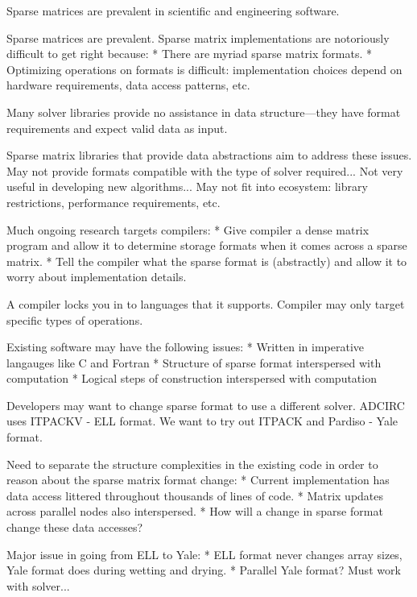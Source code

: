 \documentclass[12pt]{article}
\begin{document}
Sparse matrices are prevalent in scientific and engineering software. 

Sparse matrices are prevalent.
Sparse matrix implementations are notoriously difficult to get right because:
* There are myriad sparse matrix formats.
* Optimizing operations on formats is difficult: implementation choices depend on hardware requirements, data access patterns, etc.

Many solver libraries provide no assistance in data structure---they have format requirements and expect valid data as input.


Sparse matrix libraries that provide data abstractions aim to address these issues.
May not provide formats compatible with the type of solver required...
Not very useful in developing new algorithms...
May not fit into ecosystem: library restrictions, performance requirements, etc.

Much ongoing research targets compilers:
* Give compiler a dense matrix program and allow it to determine storage formats when it comes across a sparse matrix.
* Tell the compiler what the sparse format is (abstractly) and allow it to worry about implementation details.

A compiler locks you in to languages that it supports.
Compiler may only target specific types of operations.

Existing software may have the following issues:
* Written in imperative langauges like C and Fortran
* Structure of sparse format interspersed with computation
* Logical steps of construction interspersed with computation

Developers may want to change sparse format to use a different solver.
ADCIRC uses ITPACKV - ELL format.
We want to try out ITPACK and Pardiso - Yale format.

Need to separate the structure complexities in the existing code in order to reason about the sparse matrix format change:
* Current implementation has data access littered throughout thousands of lines of code.
* Matrix updates across parallel nodes also interspersed.
* How will a change in sparse format change these data accesses?

Major issue in going from ELL to Yale:
* ELL format never changes array sizes, Yale format does during wetting and drying.
* Parallel Yale format? Must work with solver...
\end{document}

